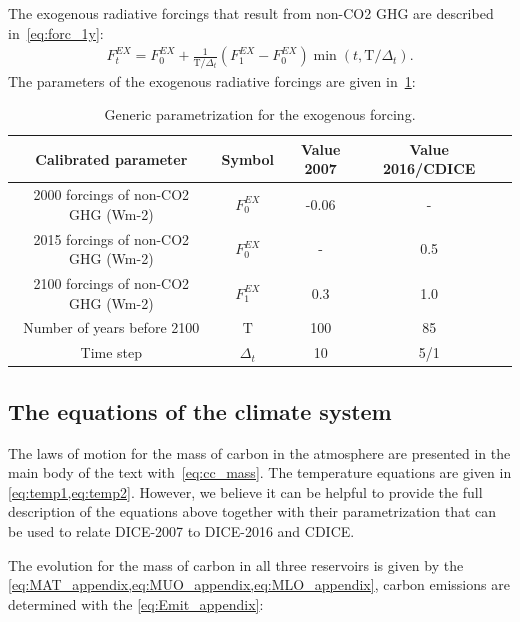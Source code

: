\documentclass[11pt, a4paper, pdftex, twoside, dvipsnames]{article}
\begin{document}
\begin{appendices}
The exogenous radiative forcings that result from non-CO2 GHG are described in~\cref{eq:forc_1y}:
\begin{align}
    \label{eq:forc_1y}
        F^{EX}_{t} = F^{EX}_{0} + \frac{1}{\text{T}/\Delta_t}(F^{EX}_{1} -F^{EX}_{0}) \min(t, \text{T}/\Delta_t).
  \end{align}
The parameters of the exogenous radiative forcings are given in~\cref{table:FEX}:
\begin{table}[H]
\centering
\begin{tabular}{ c c c c c  } 
 \toprule
 Calibrated parameter & Symbol  & Value 2007 & Value 2016/CDICE \\ 
 \midrule
 2000 forcings of non-CO2 GHG (Wm-2) & $F^{EX}_{0}$  & -0.06 & -  \\
 2015 forcings of non-CO2 GHG (Wm-2) & $F^{EX}_{0}$  & - & 0.5  \\ 
 2100 forcings of non-CO2 GHG (Wm-2) & $F^{EX}_{1}$  & 0.3 & 1.0  \\  
 Number of years before 2100 & $\text{T}$  & 100 & 85 \\ 
 Time step & $\Delta_t$ & 10 & 5/1 \\
 \bottomrule
\end{tabular}
\caption{Generic parametrization for the exogenous forcing.}
\label{table:FEX}
\end{table}


\subsection{The equations of the climate system}
\label{sec:climate2}

The laws of motion for the mass of carbon in the atmosphere are presented in the main body of the text with~\cref{eq:cc_mass}. The temperature equations are given in \cref{eq:temp1,eq:temp2}.  However, we believe it can be helpful to provide the full description of the equations above together with their parametrization that can be used to relate DICE-2007 to DICE-2016 and CDICE.


The evolution for the mass of carbon in all three reservoirs is given by the \cref{eq:MAT_appendix,eq:MUO_appendix,eq:MLO_appendix}, carbon emissions are determined with the \cref{eq:Emit_appendix}:



\end{appendices}
\end{document}

